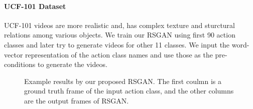 \documentclass{article}
\begin{document}
\paragraph{UCF-101 Dataset}
UCF-101 videos are more realistic and, has complex texture and sturctural relations among various objects. We train our RSGAN using first 90 action classes and later try to generate videos for other 11 classes. We input the word-vector representation of the action class names and use those as the pre-conditions to generate the videos. 

\begin{figure}[htbp]
    \centering
	\hfill
	\hfill
	
	\caption{Example results by our proposed RSGAN. The first coulmn is a ground truth frame of the input action class, and the other columns are the output frames of RSGAN.} \label{fig:1}    

\end{figure}
\FloatBarrier


%
%
\end{document}
